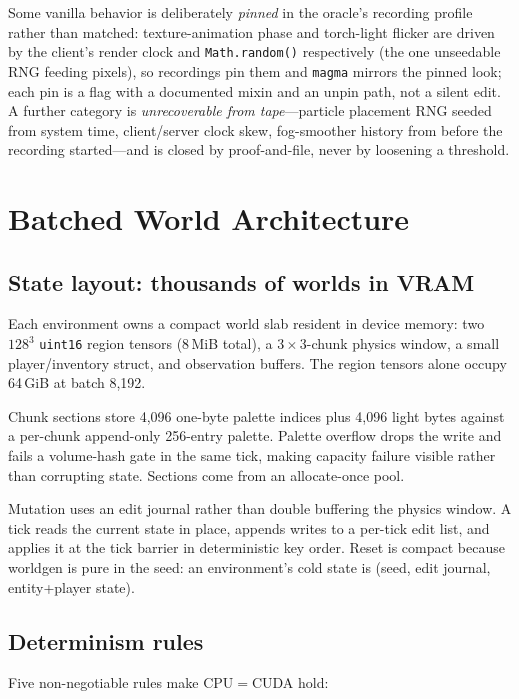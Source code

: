 \documentclass[11pt]{article}
\begin{document}
Some vanilla behavior is deliberately \emph{pinned} in the oracle's recording profile rather than matched: texture-animation phase and torch-light flicker are driven by the client's render clock and \texttt{Math.random()} respectively (the one unseedable RNG feeding pixels), so recordings pin them and \texttt{magma} mirrors the pinned look; each pin is a flag with a documented mixin and an unpin path, not a silent edit. A further category is \emph{unrecoverable from tape}---particle placement RNG seeded from system time, client/server clock skew, fog-smoother history from before the recording started---and is closed by proof-and-file, never by loosening a threshold.

\section{Batched World Architecture}
\label{sec:batched}

\subsection{State layout: thousands of worlds in VRAM}

Each environment owns a compact world slab resident in device memory: two $128^3$ \texttt{uint16} region tensors (8\,MiB total), a $3\times3$-chunk physics window, a small player/inventory struct, and observation buffers. The region tensors alone occupy 64\,GiB at batch 8{,}192.

Chunk sections store 4{,}096 one-byte palette indices plus 4{,}096 light bytes against a per-chunk append-only 256-entry palette. Palette overflow drops the write and fails a volume-hash gate in the same tick, making capacity failure visible rather than corrupting state. Sections come from an allocate-once pool.

Mutation uses an edit journal rather than double buffering the physics window. A tick reads the current state in place, appends writes to a per-tick edit list, and applies it at the tick barrier in deterministic key order. Reset is compact because worldgen is pure in the seed: an environment's cold state is (seed, edit journal, entity+player state).

\subsection{Determinism rules}

Five non-negotiable rules make CPU$=$CUDA hold:
\end{document}
